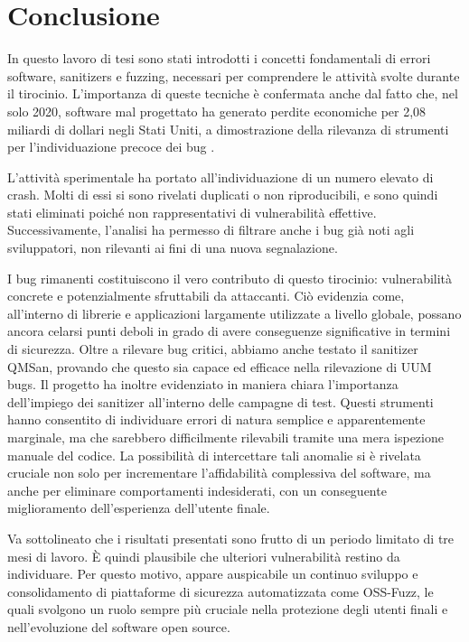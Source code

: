 \chapter{Conclusione}

In questo lavoro di tesi sono stati introdotti i concetti fondamentali di errori software, sanitizers e fuzzing, necessari per comprendere le attività svolte durante il tirocinio. L’importanza di queste tecniche è confermata anche dal fatto che, nel solo 2020, software mal progettato ha generato perdite economiche per 2,08 miliardi di dollari negli Stati Uniti, a dimostrazione della rilevanza di strumenti per l’individuazione precoce dei bug \cite{ref32}.

L’attività sperimentale ha portato all’individuazione di un numero elevato di crash. Molti di essi si sono rivelati duplicati o non riproducibili, e sono quindi stati eliminati poiché non rappresentativi di vulnerabilità effettive. Successivamente, l’analisi ha permesso di filtrare anche i bug già noti agli sviluppatori, non rilevanti ai fini di una nuova segnalazione.

I bug rimanenti costituiscono il vero contributo di questo tirocinio: vulnerabilità concrete e potenzialmente sfruttabili da attaccanti. Ciò evidenzia come, all’interno di librerie e applicazioni largamente utilizzate a livello globale, possano ancora celarsi punti deboli in grado di avere conseguenze significative in termini di sicurezza.
Oltre a rilevare bug critici, abbiamo anche testato il sanitizer QMSan, provando che questo sia capace ed efficace nella rilevazione di UUM bugs. 
Il progetto ha inoltre evidenziato in maniera chiara l’importanza dell’impiego dei sanitizer all’interno delle campagne di test. Questi strumenti hanno consentito di individuare errori di natura semplice e apparentemente marginale, ma che sarebbero difficilmente rilevabili tramite una mera ispezione manuale del codice. La possibilità di intercettare tali anomalie si è rivelata cruciale non solo per incrementare l’affidabilità complessiva del software, ma anche per eliminare comportamenti indesiderati, con un conseguente miglioramento dell’esperienza dell’utente finale.

Va sottolineato che i risultati presentati sono frutto di un periodo limitato di tre mesi di lavoro. È quindi plausibile che ulteriori vulnerabilità restino da individuare. Per questo motivo, appare auspicabile un continuo sviluppo e consolidamento di piattaforme di sicurezza automatizzata come OSS-Fuzz, le quali svolgono un ruolo sempre più cruciale nella protezione degli utenti finali e nell’evoluzione del software open source.
